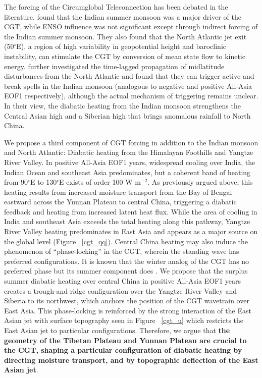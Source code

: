 	The forcing of the Circumglobal Teleconnection has been debated in the literature. \citep{Ding2005} found that the Indian summer monsoon was a major driver of the CGT, while ENSO influence was not significant except through indirect forcing of the Indian summer monsoon. They also found that the North Atlantic jet exit (50$^{\circ}$E), a region of high variability in geopotential height and baroclinic instability, can stimulate the CGT by conversion of mean state flow to kinetic energy. \citet{Ding2007} further investigated the time-lagged propagation of midlatitude disturbances from the North Atlantic and found that they can trigger active and break spells in the Indian monsoon (analogous to negative and positive All-Asia EOF1 respectively), although the actual mechanism of triggering remains unclear. In their view, the diabatic heating from the Indian monsoon strengthens the Central Asian high and a Siberian high that brings anomalous rainfall to North China.
		
	We propose a third component of CGT forcing in addition to the Indian monsoon and North Atlantic: Diabatic heating from the Himalayan Foothills and Yangtze River Valley. In positive All-Asia EOF1 years, widespread cooling over India, the Indian Ocean and southeast Asia predominates, but a coherent band of heating from 90$^{\circ}$E to 130$^{\circ}$E exists of order 100 W m$^{-2}$. As previously argued above, this heating results from increased moisture transport from the Bay of Bengal eastward across the Yunnan Plateau to central China, triggering a diabatic feedback and heating from increased latent heat flux. While the area of cooling in India and southeast Asia exceeds the total heating along this pathway, Yangtze River Valley heating predominates in East Asia and appears as a major source on the global level (Figure ~\ref{cgt_qq}). Central China heating may also induce the phenomenon of ``phase-locking'' in the CGT, wherein the standing wave has preferred configurations. It is known that the winter analog of the CGT has no preferred phase \citep{Branstator2002} but its summer component does \citep{Ding2005}. We propose that the surplus summer diabatic heating over central China in positive All-Asia EOF1 years creates a trough-and-ridge configuration over the Yangtze River Valley and Siberia to its northwest, which anchors the position of the CGT wavetrain over East Asia. This phase-locking is reinforced by the strong interaction of the East Asian jet with surface topography seen in Figure ~\ref{cgt_u} which restricts the East Asian jet to particular configurations. Therefore, we argue that \textbf{the geometry of the Tibetan Plateau and Yunnan Plateau are crucial to the CGT, shaping a particular configuration of diabatic heating by directing moisture transport, and by topographic deflection of the East Asian jet}.

